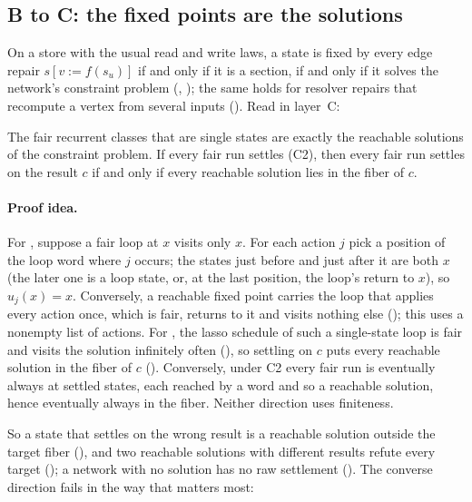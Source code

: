 \subsection{B to C: the fixed points are the solutions}

On a store with the usual read and write laws, a state is fixed by every edge repair
$s[v := f(s_u)]$ if and only if it is a section, if and only if it solves the network's constraint
problem (, ); the same holds for resolver
repairs that recompute a vertex from several inputs (). Read in layer~C:

\begin{theorem}\label{thm:bc}
The fair recurrent classes that are single states are exactly the reachable solutions of the
constraint problem. If every fair run settles (C2), then every fair run settles on the result $c$ if
and only if every reachable solution lies in the fiber of $c$.
\end{theorem}

\paragraph{Proof idea.}
For , suppose a fair loop at $x$ visits only $x$. For each action $j$ pick
a position of the loop word where $j$ occurs; the states just before and just after it are both $x$
(the later one is a loop state, or, at the last position, the loop's return to $x$), so $u_j(x) = x$.
Conversely, a reachable fixed point carries the loop that applies every action once, which is fair,
returns to it and visits nothing else (); this uses a nonempty list of actions. For
, the lasso schedule of such a single-state loop is fair and visits the
solution infinitely often (), so settling on $c$ puts every reachable solution in the
fiber of $c$ (). Conversely, under C2 every fair run is eventually always at
settled states, each reached by a word and so a reachable solution, hence eventually always in the
fiber. Neither direction uses finiteness.

So a state that settles on the wrong result is a reachable solution outside the target fiber
(), and two reachable solutions with different results refute every target
(); a network with no solution has no raw settlement
(). The converse direction fails in the way that matters most:

